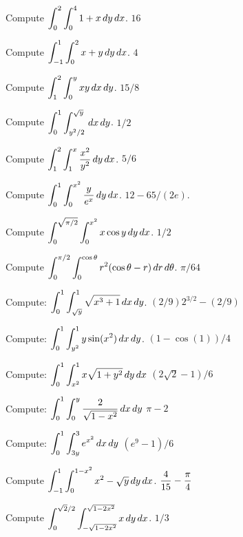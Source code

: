 \exercises

\exercise Compute $\displaystyle \int_{0}^{2}\int_{0}^{4} 1+x \,dy\,dx$.
\answer $16$
\endanswer
\endexercise

\exercise Compute $\displaystyle \int_{-1}^{1}\int_{0}^{2} x+y\,dy\,dx$.
\answer $4$
\endanswer

\endexercise

\exercise Compute $\displaystyle \int_{1}^{2}\int_{0}^{y} xy \,dx\,dy$.
\answer $15/8$
\endanswer

\endexercise

\exercise Compute $\displaystyle \int_{0}^{1}\int_{y^2/2}^{\sqrt y} \,dx\,dy$.
\answer $1/2$
\endanswer

\endexercise

\exercise Compute $\displaystyle \int_{1}^{2}\int_{1}^{x} {x^2\over y^2}\,dy\,dx$.
\answer $5/6$
\endanswer

\endexercise

\exercise Compute $\displaystyle \int_{0}^{1}\int_{0}^{x^2} {y\over e^x}\,dy\,dx$.
\answer $12-65/(2e)$.
\endanswer

\endexercise

\exercise Compute $\displaystyle \int_{0}^{\sqrt{\pi/2}}\int_{0}^{x^2} x\cos y\,dy\,dx$.
\answer $1/2$
\endanswer

\endexercise

\exercise Compute $\displaystyle \int_{0}^{\pi/2}\int_{0}^{\cos\theta}r^2
(\cos\theta-r) \,dr\,d\theta$.
\answer $\pi/64$
\endanswer
\endexercise

\exercise  Compute: $\displaystyle \int_0^1\int_{\sqrt{y}}^1 
\sqrt{x^3+1}\,dx\,dy$.
\answer $(2/9)2^{3/2}-(2/9)$
\endanswer
\endexercise

\exercise Compute: $\displaystyle \int_0^1\int_{y^2}^1 
y\sin(x^2)\,dx\,dy$.
\answer $(1-\cos(1))/4$
\endanswer
\endexercise

\exercise Compute: $\displaystyle \int_0^1 \int_{x^2}^1 x\sqrt{1+y^2}\,dy\,dx$
\answer $(2\sqrt2-1)/6$
\endanswer
\endexercise

\exercise Compute: $\displaystyle \int_0^1 \int_0^y
	  {2\over\sqrt{1-x^2}}\,dx\,dy$
\answer $\pi-2$
\endanswer

\endexercise

\exercise Compute: $\displaystyle \int_0^1 \int_{3y}^3
	  e^{x^2}\,dx\,dy$
\answer $(e^9-1)/6$
\endanswer

\endexercise

\exercise Compute $\displaystyle \int_{-1}^1\int_0^{1-x^2} x^2-\sqrt{y}\,dy\,dx$.
\answer $\displaystyle {4\over15}-{\pi\over4}$
\endanswer
\endexercise

\exercise Compute 
$\displaystyle \int_{0}^{\sqrt2/2}\int_{-\sqrt{1-2x^2}}^{\sqrt{1-2x^2}} x\,dy\,dx$.
\answer $1/3$
\endanswer


